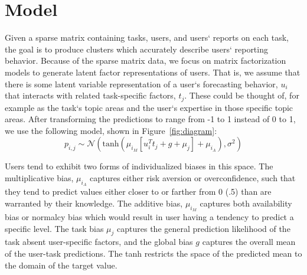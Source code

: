 \documentclass{article}
\begin{document}
\section{Model}





Given a sparse matrix containing tasks, users, and users` reports on each task, the goal is to produce clusters which accurately describe users` reporting behavior. Because of the sparse matrix data, we focus on matrix factorization models to generate latent factor representations of users. That is, we assume that there is some latent variable representation of a user`s forecasting behavior, $u_i$ that interacts with related task-specific factors, $t_j$. These could be thought of, for example as the task`s topic areas and the user`s expertise in those specific topic areas. After transforming the predictions to range from -1 to 1 instead of 0 to 1, we use the following model, shown in Figure~\ref{fig:diagram}:  
  $$
  p_{i,j} \sim \mathcal{N}(\textrm{tanh}\left( \mu_{i_M}\left[u_i^{T}t_j + g + \mu_j\right] + \mu_{i_A}\right), \sigma^2)
 $$
 
 Users tend to exhibit two forms of individualized biases in this space. The multiplicative bias, $\mu_{i_A}$ captures either risk aversion or overconfidence, such that they tend to predict values either closer to or farther from 0 (.5) than are warranted by their knowledge. The additive bias, $ \mu_{i_M}$ captures both availability bias or normalcy bias which would result in user having a tendency to predict a specific level. The task bias $\mu_j$ captures the general prediction likelihood of the task absent user-specific factors, and the global bias $g$ captures the overall mean of the user-task predictions.
  The tanh restricts the space of the predicted mean to the domain of the target value.
  
\end{document}
